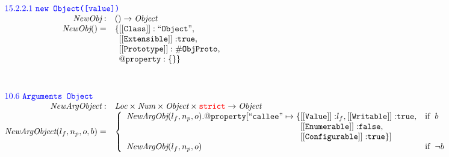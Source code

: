 \[
\begin{array}{rl}

\multicolumn{2}{l}{\mbox{\inblue 15.2.2.1 {\tt new Object([value])}}}\\
\hf{NewObj} :& () \rightarrow \Obj \\
\hf{NewObj}() =&
{\tt \{[[Class]]: ``Object"}, \\%
& \phantom{\{}
{\tt [[Extensible]]:} \true,\\
& \phantom{\{}{\tt [[Prototype]]: \#ObjProto}, \\
& \phantom{\{}{\tt @property: \{\}}\}\\
\\[2em]


\multicolumn{2}{l}{\mbox{\inblue 10.6 {\tt Arguments Object}}}\\
\hf{NewArgObject} :& \Loc \times \Num \times \Obj \times \strict \rightarrow \Obj \\
\hf{NewArgObject}(l_f, n_p, o, b) =&
\left\{\begin{array}{ll}
\hf{NewArgObj}(l_f, n_p, o).{\tt @property}[{\tt``callee"}\mapsto\{{\tt [[Value]]:}l_f,%
{\tt [[Writable]]:} \true, &\ifc{b}\\%
\phantom{\hf{NewArgObj}(l_f, n_p, o).{\tt @property}[{\tt``callee"}\mapsto\{}%
{\tt [[Enumerable]]:} \false,
&\\
\phantom{\hf{NewArgObj}(l_f, n_p, o).{\tt @property}[{\tt``callee"}\mapsto\{}%
{\tt [[Configurable]]:} \true
\}]&\\
\hf{NewArgObj}(l_f, n_p, o) &\ifc{\neg b}\\
\end{array}\right.
\\\\


\end{array}\]
